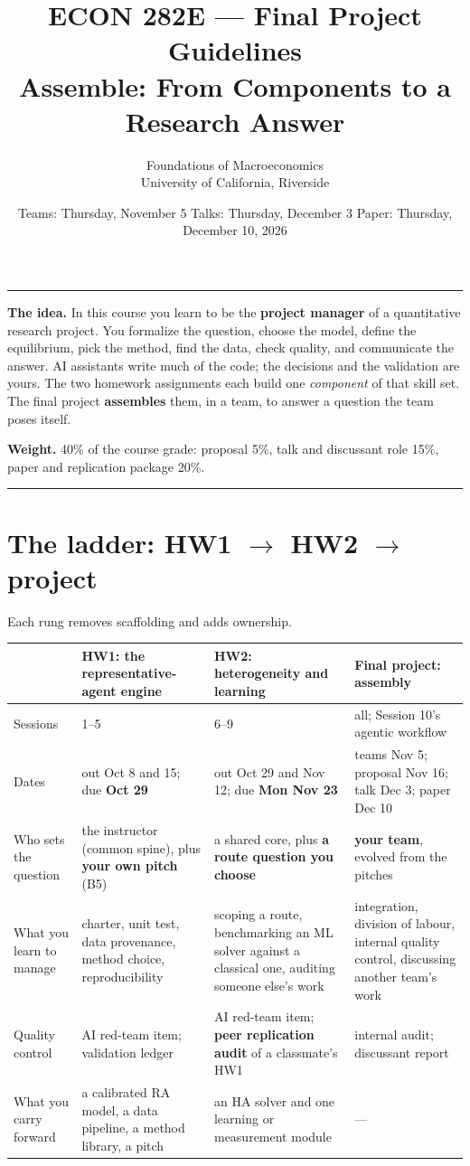 \documentclass[11pt]{article}
\title{\vspace{-2em}\textbf{ECON 282E --- Final Project Guidelines}\\[2mm]
       \large Assemble: From Components to a Research Answer}
\author{Foundations of Macroeconomics \\ University of California, Riverside}
\date{Teams: Thursday, November 5 \quad\textbullet\quad Talks: Thursday, December 3
      \quad\textbullet\quad Paper: Thursday, December 10, 2026}
\begin{document}
\maketitle
\thispagestyle{empty}

\noindent\rule{\linewidth}{0.4pt}\par
\small
\textbf{The idea.} In this course you learn to be the \textbf{project manager} of a quantitative
research project. You formalize the question, choose the model, define the equilibrium, pick the
method, find the data, check quality, and communicate the answer. AI assistants write much of the
code; the decisions and the validation are yours. The two homework assignments each build one
\emph{component} of that skill set. The final project \textbf{assembles} them, in a team, to answer
a question the team poses itself.

\textbf{Weight.} 40\% of the course grade: proposal 5\%, talk and discussant role 15\%, paper and
replication package 20\%.
\normalsize\par
\noindent\rule{\linewidth}{0.4pt}\par

\section{The ladder: HW1 \texorpdfstring{$\to$}{->} HW2 \texorpdfstring{$\to$}{->} project}

Each rung removes scaffolding and adds ownership.

\medskip
{\small
\renewcommand{\arraystretch}{1.25}
\noindent\begin{tabularx}{\linewidth}{@{}p{2.6cm}LLL@{}}
\toprule
 & \textbf{HW1: the representative-agent engine} & \textbf{HW2: heterogeneity and learning} & \textbf{Final project: assembly} \\
\midrule
Sessions & 1--5 & 6--9 & all; Session 10's agentic workflow \\
Dates & out Oct 8 and 15; due \textbf{Oct 29} & out Oct 29 and Nov 12; due \textbf{Mon Nov 23} & teams Nov 5; proposal Nov 16; talk Dec 3; paper Dec 10 \\
Who sets the question & the instructor (common spine), plus \textbf{your own pitch} (B5) & a shared core, plus \textbf{a route question you choose} & \textbf{your team}, evolved from the pitches \\
What you learn to manage & charter, unit test, data provenance, method choice, reproducibility & scoping a route, benchmarking an ML solver against a classical one, auditing someone else's work & integration, division of labour, internal quality control, discussing another team's work \\
Quality control & AI red-team item; validation ledger & AI red-team item; \textbf{peer replication audit} of a classmate's HW1 & internal audit; discussant report \\
What you carry forward & a calibrated RA model, a data pipeline, a method library, a pitch & an HA solver and one learning or measurement module & --- \\
\bottomrule
\end{tabularx}
}
\end{document}
